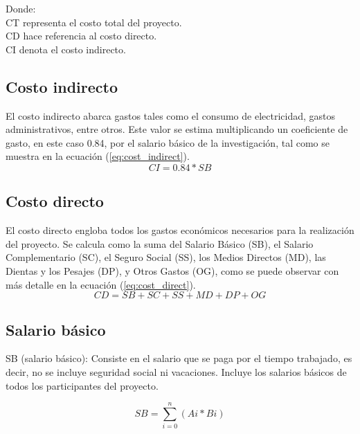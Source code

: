 Donde: \\
CT representa el costo total del proyecto. \\
CD hace referencia al costo directo. \\
CI denota el costo indirecto.

\subsection{Costo indirecto}

El costo indirecto abarca gastos tales como el consumo de electricidad, gastos administrativos, entre otros.
Este valor se estima multiplicando un coeficiente de gasto, en este caso 0.84, por el salario básico de la
investigación, tal como se muestra en la ecuación (\ref{eq:cost_indirect}). \\

\begin{equation}
    \label{eq:cost_indirect}
    CI = 0.84 * SB
\end{equation}

\subsection{Costo directo}

El costo directo engloba todos los gastos económicos necesarios para la realización del proyecto. Se
calcula como la suma del Salario Básico (SB), el Salario Complementario (SC), el Seguro Social (SS), los
Medios Directos (MD), las Dientas y los Pesajes (DP), y Otros Gastos (OG), como se puede observar con más
detalle en la ecuación (\ref{eq:cost_direct}). \\

\begin{equation}
    \label{eq:cost_direct}
    CD = SB + SC + SS + MD + DP + OG
\end{equation}

\subsection{Salario básico}

SB (salario básico): Consiste en el salario que se paga por el tiempo trabajado, es decir, no se incluye seguridad social ni vacaciones. Incluye los salarios básicos de todos los participantes del proyecto.


\begin{equation}
    \label{eq:sal_basico}
    SB = \sum_{i = 0}^{n} (Ai * Bi)
\end{equation}

